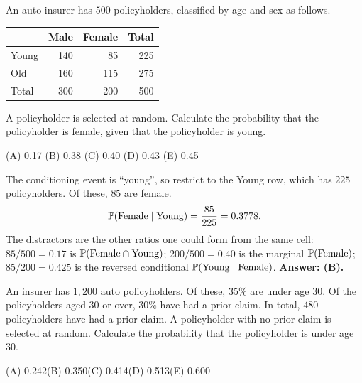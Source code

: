 \begin{example}
An auto insurer has $500$ policyholders, classified by age and sex as follows.

\begin{center}
\begin{tabular}{@{}lrrr@{}}
\toprule
 & Male & Female & Total \\
\midrule
Young & 140 & 85  & 225 \\
Old   & 160 & 115 & 275 \\
\midrule
Total & 300 & 200 & 500 \\
\bottomrule
\end{tabular}
\end{center}

A policyholder is selected at random. Calculate the probability that the
policyholder is female, given that the policyholder is young.

\medskip
(A) 0.17 \quad (B) 0.38 \quad (C) 0.40 \quad (D) 0.43 \quad (E) 0.45
\end{example}

\begin{solution}
The conditioning event is ``young'', so restrict to the Young row, which has
$225$ policyholders. Of these, $85$ are female.
\[
\mathbb{P}(\text{Female} \mid \text{Young}) = \frac{85}{225} = 0.3778 .
\]
The distractors are the other ratios one could form from the same cell: $85/500 = 0.17$ is
$\mathbb{P}(\text{Female} \cap \text{Young})$; $200/500 = 0.40$ is the marginal $\mathbb{P}(\text{Female})$;
$85/200 = 0.425$ is the reversed conditional $\mathbb{P}(\text{Young} \mid \text{Female})$.
\textbf{Answer: (B).}
\end{solution}

\begin{example}
An insurer has $1{,}200$ auto policyholders. Of these, $35\%$ are under age
$30$. Of the policyholders aged $30$ or over, $30\%$ have had a prior claim.
In total, $480$ policyholders have had a prior claim. A policyholder with no
prior claim is selected at random. Calculate the probability that the
policyholder is under age $30$.

\medskip
(A) 0.242\qquad (B) 0.350\qquad (C) 0.414\qquad (D) 0.513\qquad (E) 0.600
\end{example}

